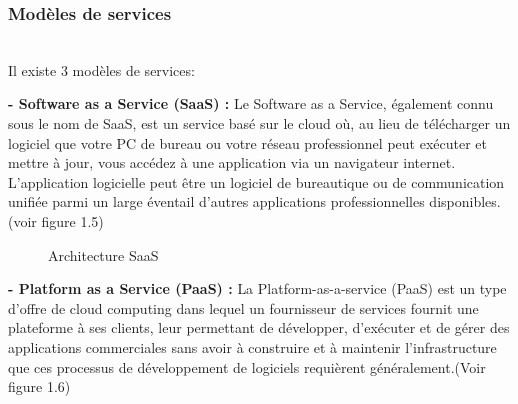 \subsubsection{\Large Modèles de services }
\texttt{}\\[0.1cm]
\textsf{\selectfont{}Il existe 3 modèles de services:}
\texttt{}\\[0.1cm]
\par \noindent \textbf{\LARGE - Software as a Service (SaaS) : }\textsf{\selectfont{} Le Software as a Service, également connu sous le nom de SaaS, est un service basé sur le cloud où, au lieu de télécharger un logiciel que votre PC de bureau ou votre réseau professionnel peut exécuter et mettre à jour, vous accédez à une application via un navigateur internet. L'application logicielle peut être un logiciel de bureautique ou de communication unifiée parmi un large éventail d'autres applications professionnelles disponibles.\cite{3} (voir figure 1.5)}
\begin{figure}[H]
    \begin{center}
    \end{center}

    \caption{ Architecture SaaS
    }
\end{figure}
\noindent \textbf{\LARGE - Platform as a Service (PaaS) : }\textsf{\selectfont{} La Platform-as-a-service (PaaS) est un type d'offre de cloud computing dans lequel un fournisseur de services fournit une plateforme à ses clients, leur permettant de développer, d'exécuter et de gérer des applications commerciales sans avoir à construire et à maintenir l'infrastructure que ces processus de développement de logiciels requièrent généralement.(Voir figure 1.6)\cite{4}}\\[0.1cm]
